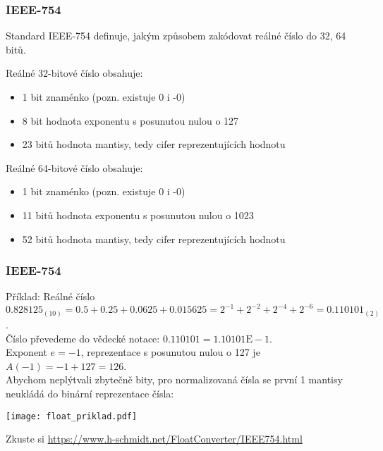 \documentclass{beamer}
\begin{document}
\begin{frame}
\frametitle{IEEE-754}

Standard IEEE-754 definuje, jakým způsobem zakódovat reálné číslo do 32, 64 bitů.

Reálné 32-bitové číslo obsahuje:
\begin{itemize}
\item 1 bit znaménko (pozn. existuje 0 i -0)
\item 8 bit hodnota exponentu s posunutou nulou o 127
\item 23 bitů hodnota mantisy, tedy cifer reprezentujících hodnotu
\end{itemize}
\bigskip
Reálné 64-bitové číslo obsahuje:
\begin{itemize}
\item 1 bit znaménko (pozn. existuje 0 i -0)
\item 11 bitů hodnota exponentu s posunutou nulou o 1023
\item 52 bitů hodnota mantisy, tedy cifer reprezentujících hodnotu
\end{itemize}

\end{frame}


\begin{frame}
\frametitle{IEEE-754}

Příklad:
Reálné číslo $0.828125_{(10)} = 0.5+0.25+0.0625+0.015625=2^{-1}+2^{-2}+2^{-4}+2^{-6} = 0.110101_{(2)}$.\\
Číslo převedeme do vědecké notace: $0.110101 = 1.10101\text{E}-1$.\\
Exponent $e=-1$, reprezentace s posunutou nulou o 127 je $A(-1)=-1+127 = 126$.\\
Abychom neplýtvali zbytečně bity, pro normalizovaná čísla se první 1 mantisy neukládá do binární reprezentace čísla:

\begin{center}
\texttt{[image: float\_priklad.pdf]}
\end{center}

Zkuste si \url{https://www.h-schmidt.net/FloatConverter/IEEE754.html}
\end{frame}
\end{document}
